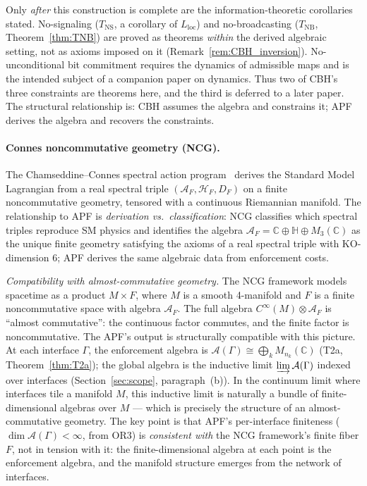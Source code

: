 \documentclass[11pt,a4paper]{article}
\theoremstyle{definition}
\begin{document}
\smallskip\noindent Only \emph{after} this construction is complete are the information-theoretic corollaries stated.  No-signaling ($T_{\mathrm{NS}}$, a corollary of $L_{\mathrm{loc}}$) and no-broadcasting ($T_{\mathrm{NB}}$, Theorem~\ref{thm:TNB}) are proved as theorems \emph{within} the derived algebraic setting, not as axioms imposed on it (Remark~\ref{rem:CBH_inversion}).  No-unconditional bit commitment requires the dynamics of admissible maps and is the intended subject of a companion paper on dynamics.  Thus two of CBH's three constraints are theorems here, and the third is deferred to a later paper.  The structural relationship is: CBH assumes the algebra and constrains it; APF derives the algebra and recovers the constraints.

\paragraph{Connes noncommutative geometry (NCG).}
The Chamseddine--Connes spectral action program~\cite{ConnesMarcolli2008} derives the Standard Model Lagrangian from a real spectral triple $(\mathcal{A}_F, \mathcal{H}_F, D_F)$ on a finite noncommutative geometry, tensored with a continuous Riemannian manifold.  The relationship to APF is \emph{derivation vs.\ classification}: NCG classifies which spectral triples reproduce SM physics and identifies the algebra $\mathcal{A}_F = \mathbb{C} \oplus \mathbb{H} \oplus M_3(\mathbb{C})$ as the unique finite geometry satisfying the axioms of a real spectral triple with KO-dimension 6; APF derives the same algebraic data from enforcement costs.

\smallskip\noindent\textit{Compatibility with almost-commutative geometry.}  The NCG framework models spacetime as a product $M \times F$, where $M$ is a smooth 4-manifold and $F$ is a finite noncommutative space with algebra $\mathcal{A}_F$.  The full algebra $C^\infty(M) \otimes \mathcal{A}_F$ is ``almost commutative'': the continuous factor commutes, and the finite factor is noncommutative.  The APF's output is structurally compatible with this picture.  At each interface $\Gamma$, the enforcement algebra is $\mathcal{A}(\Gamma) \cong \bigoplus_k M_{n_k}(\mathbb{C})$ (T2a, Theorem~\ref{thm:T2a}); the global algebra is the inductive limit $\varinjlim \mathcal{A}(\Gamma)$ indexed over interfaces (Section~\ref{sec:scope}, paragraph~(b)).  In the continuum limit where interfaces tile a manifold $M$, this inductive limit is naturally a bundle of finite-dimensional algebras over $M$ --- which is precisely the structure of an almost-commutative geometry.  The key point is that APF's per-interface finiteness ($\dim \mathcal{A}(\Gamma) < \infty$, from OR3) is \emph{consistent with} the NCG framework's finite fiber $F$, not in tension with it: the finite-dimensional algebra at each point is the enforcement algebra, and the manifold structure emerges from the network of interfaces.
\end{document}
